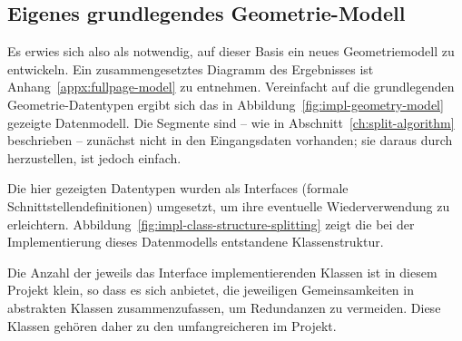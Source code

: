 \documentclass[../main/thesis.tex]{subfiles}
\begin{document}
\subsection{Eigenes grundlegendes Geometrie-Modell}
\label{ch:data-structures-new}

Es erwies sich also als notwendig, auf dieser Basis ein neues Geometriemodell zu entwickeln.
Ein zusammengesetztes Diagramm des Ergebnisses ist Anhang~\ref{appx:fullpage-model} zu entnehmen.
Vereinfacht auf die grundlegenden Geometrie-Datentypen ergibt sich das in Abbildung~\ref{fig:impl-geometry-model} gezeigte Datenmodell.
Die Segmente sind -- wie in Abschnitt~\ref{ch:split-algorithm} beschrieben -- zunächst nicht in den Eingangsdaten vorhanden; sie daraus durch  herzustellen, ist jedoch einfach.



Die hier gezeigten Datentypen wurden als Interfaces (formale Schnittstellendefinitionen) umgesetzt, um ihre eventuelle Wiederverwendung zu erleichtern. 
Abbildung~\ref{fig:impl-class-structure-splitting} zeigt die bei der Implementierung dieses Datenmodells entstandene Klassenstruktur.


Die Anzahl der jeweils das Interface implementierenden Klassen ist in diesem Projekt klein, so dass es sich anbietet, die jeweiligen Gemeinsamkeiten in abstrakten Klassen
zusammenzufassen, um Redundanzen zu vermeiden.
Diese Klassen gehören daher zu den umfangreicheren im Projekt.
\end{document}
